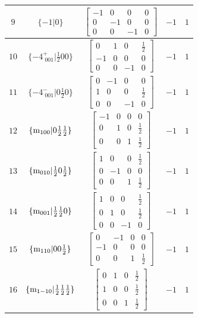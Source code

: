 \documentclass[fleqn,8pt]{jsarticle}
\begin{document}
\begin{longtable}{ccccc}
$ 9 $ & $ \{-1|0\} $ & $ \begin{bmatrix} -1 & 0 & 0 & 0 \\ 0 & -1 & 0 & 0 \\ 0 & 0 & -1 & 0 \end{bmatrix} $ & $ -1 $ & $ 1 $ \\ \hline
$ 10 $ & $ \{-4^{+}_{\,\,001}|\frac{1}{2} 0 0\} $ & $ \begin{bmatrix} 0 & 1 & 0 & \frac{1}{2} \\ -1 & 0 & 0 & 0 \\ 0 & 0 & -1 & 0 \end{bmatrix} $ & $ -1 $ & $ 1 $ \\ \hline
$ 11 $ & $ \{-4^{-}_{\,\,001}|0 \frac{1}{2} 0\} $ & $ \begin{bmatrix} 0 & -1 & 0 & 0 \\ 1 & 0 & 0 & \frac{1}{2} \\ 0 & 0 & -1 & 0 \end{bmatrix} $ & $ -1 $ & $ 1 $ \\ \hline
$ 12 $ & $ \{{\rm m}_{100}|0 \frac{1}{2} \frac{1}{2}\} $ & $ \begin{bmatrix} -1 & 0 & 0 & 0 \\ 0 & 1 & 0 & \frac{1}{2} \\ 0 & 0 & 1 & \frac{1}{2} \end{bmatrix} $ & $ -1 $ & $ 1 $ \\ \hline
$ 13 $ & $ \{{\rm m}_{010}|\frac{1}{2} 0 \frac{1}{2}\} $ & $ \begin{bmatrix} 1 & 0 & 0 & \frac{1}{2} \\ 0 & -1 & 0 & 0 \\ 0 & 0 & 1 & \frac{1}{2} \end{bmatrix} $ & $ -1 $ & $ 1 $ \\ \hline
$ 14 $ & $ \{{\rm m}_{001}|\frac{1}{2} \frac{1}{2} 0\} $ & $ \begin{bmatrix} 1 & 0 & 0 & \frac{1}{2} \\ 0 & 1 & 0 & \frac{1}{2} \\ 0 & 0 & -1 & 0 \end{bmatrix} $ & $ -1 $ & $ 1 $ \\ \hline
$ 15 $ & $ \{{\rm m}_{110}|0 0 \frac{1}{2}\} $ & $ \begin{bmatrix} 0 & -1 & 0 & 0 \\ -1 & 0 & 0 & 0 \\ 0 & 0 & 1 & \frac{1}{2} \end{bmatrix} $ & $ -1 $ & $ 1 $ \\ \hline
$ 16 $ & $ \{{\rm m}_{1-10}|\frac{1}{2} \frac{1}{2} \frac{1}{2}\} $ & $ \begin{bmatrix} 0 & 1 & 0 & \frac{1}{2} \\ 1 & 0 & 0 & \frac{1}{2} \\ 0 & 0 & 1 & \frac{1}{2} \end{bmatrix} $ & $ -1 $ & $ 1 $ \\
\end{longtable}
\end{document}
